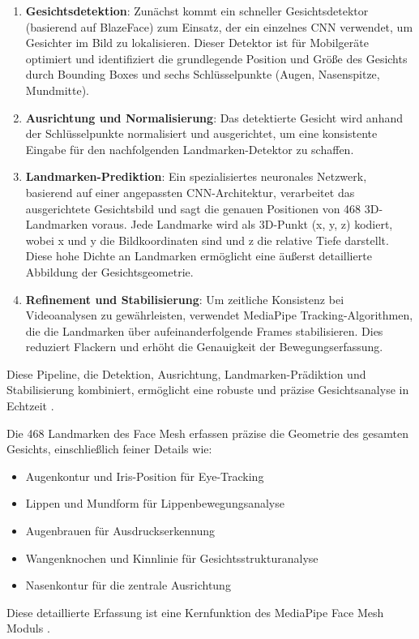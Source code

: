 \begin{enumerate}
    \item \textbf{Gesichtsdetektion}: Zunächst kommt ein schneller Gesichtsdetektor (basierend auf BlazeFace) zum Einsatz, der ein einzelnes CNN verwendet, um Gesichter im Bild zu lokalisieren. Dieser Detektor ist für Mobilgeräte optimiert und identifiziert die grundlegende Position und Größe des Gesichts durch Bounding Boxes und sechs Schlüsselpunkte (Augen, Nasenspitze, Mundmitte).
    
    \item \textbf{Ausrichtung und Normalisierung}: Das detektierte Gesicht wird anhand der Schlüsselpunkte normalisiert und ausgerichtet, um eine konsistente Eingabe für den nachfolgenden Landmarken-Detektor zu schaffen.
    
    \item \textbf{Landmarken-Prediktion}: Ein spezialisiertes neuronales Netzwerk, basierend auf einer angepassten CNN-Architektur, verarbeitet das ausgerichtete Gesichtsbild und sagt die genauen Positionen von 468 3D-Landmarken voraus. Jede Landmarke wird als 3D-Punkt (x, y, z) kodiert, wobei x und y die Bildkoordinaten sind und z die relative Tiefe darstellt. Diese hohe Dichte an Landmarken ermöglicht eine äußerst detaillierte Abbildung der Gesichtsgeometrie.
    
    \item \textbf{Refinement und Stabilisierung}: Um zeitliche Konsistenz bei Videoanalysen zu gewährleisten, verwendet MediaPipe Tracking-Algorithmen, die die Landmarken über aufeinanderfolgende Frames stabilisieren. Dies reduziert Flackern und erhöht die Genauigkeit der Bewegungserfassung.
\end{enumerate}

Diese Pipeline, die Detektion, Ausrichtung, Landmarken-Prädiktion und Stabilisierung kombiniert, ermöglicht eine robuste und präzise Gesichtsanalyse in Echtzeit \cite{mediapipe.docs}.

Die 468 Landmarken des Face Mesh erfassen präzise die Geometrie des gesamten Gesichts, einschließlich feiner Details wie:
\begin{itemize}
    \item Augenkontur und Iris-Position für Eye-Tracking
    \item Lippen und Mundform für Lippenbewegungsanalyse
    \item Augenbrauen für Ausdruckserkennung
    \item Wangenknochen und Kinnlinie für Gesichtsstrukturanalyse
    \item Nasenkontur für die zentrale Ausrichtung
\end{itemize}
Diese detaillierte Erfassung ist eine Kernfunktion des MediaPipe Face Mesh Moduls \cite{mediapipe.docs}.


